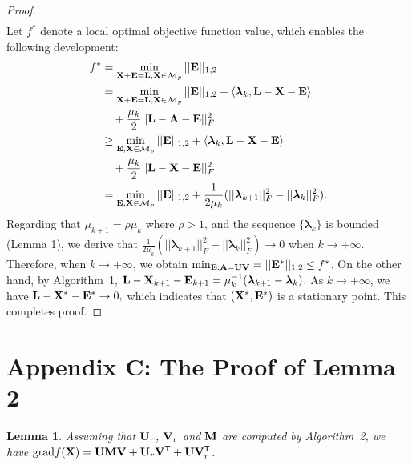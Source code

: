 \documentclass[10pt,twocolumn,letterpaper]{article}
\newtheorem{lemma}{Lemma}
\def\ranksym{p}
\def\symp{r}
\def\M{\mathcal{M}}
\def\U{{\bf U}}
\def\V{{\bf V}}
\def\trsp{{\sf T}}
\def\bA{{\bf A}}
\def\bM{{\bf M}}
\def\bE{{\bf E}}
\def\blambda{{\bm \lambda}}
\def\bL{{\bf L}}
\def\bU{{\bf U}}
\def\bV{{\bf V}}
\def\bX{{\bf X}}
\def\bA{{\bf A}}
\def\bX{{\bf X}}
\begin{document}
\begin{proof}
\begin{align}
    \end{align}
    \noindent
    Let $f^*$ denote a local optimal objective function value, which enables the following development:
    \begin{align}\label{eq:proof2}
      f^* & = \min_{\bX + \bE = \bL, \bX \in \M_{\ranksym}} || \bE ||_{1,2}   \nonumber  \\
          & = \min_{\bX + \bE = \bL, \bX \in \M_{\ranksym}} || \bE ||_{1,2} + \langle \blambda_k, \bL - \bX - \bE \rangle \nonumber \\
          & \quad + \frac{\mu_k}{2} || \bL - \bA - \bE ||_F^2   \nonumber \\
          & \geq \min_{\bE, \bX \in \M_{\ranksym}} || \bE ||_{1,2} + \langle \blambda_k, \bL - \bX - \bE \rangle \nonumber \\
          & \quad + \frac{\mu_k}{2} ||  \bL - \bX - \bE ||_F^2     \nonumber \\
          & = \min_{\bE, \bX \in \M_{\ranksym}} || \bE ||_{1,2} + \frac{1}{2\mu_k} (|| \blambda_{k+1} ||_F^2 - || \blambda_{k} ||_F^2)   .
    \end{align}
    \indent
    Regarding that $\mu_{k+1} = \rho \mu_{k}$ where $\rho > 1$, and the sequence $\{ \blambda_k \}$ is bounded (Lemma 1), we derive that
    $\frac{1}{2\mu_k} (|| \blambda_{k+1} ||_F^2 - || \blambda_{k} ||_F^2) \rightarrow 0$ when $k \rightarrow +\infty .$
    Therefore, when $k \rightarrow +\infty$, we obtain $\min_{\bE, \bA = \bU \bV} = || \bE^* ||_{1,2} \leq f^*$.
    On the other hand, by Algorithm~1, $\bL - \bX_{k+1} - \bE_{k+1} = \mu_k^{-1} (\blambda_{k+1} - \blambda_{k}) .$
    As $k \rightarrow +\infty$, we have $\bL - \bX^* - \bE^* \rightarrow 0  ,$
    which indicates that $(\bX^*, \bE^*)$ is a stationary point.
    This completes proof.
\end{proof}




\section{Appendix C: The Proof of Lemma 2}


\begin{lemma}
  Assuming that $\U_{\symp}$, $\V_{\symp}$ and $\bM$ are computed by Algorithm~2,
  we have {\small${\textnormal{grad}} f(\bX) = \U \bM \V + \U_{\symp} \V^{\trsp} + \U \V^{\trsp}_{\symp}$}.
\end{lemma}
\end{document}
